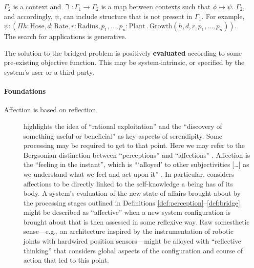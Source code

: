 $\Gamma_2$ is a context and $\beth : \Gamma_1 \rightarrow \Gamma_2$ is
a map between contexts such that $\phi \mapsto \psi$.  $\Gamma_2$, and
accordingly, $\psi$, can include structure that is not present in
$\Gamma_1$.  For example, $\psi : (\Pi h:\mathrm{Hose},
d:\mathrm{Rate}, r:\mathrm{Radius}, p_1,\ldots,p_n:\mathrm{Plant}
\mathbin{.}  \mathrm{Growth}(h,d,r,p_1,\ldots,p_n))$.  The search for
applications is generative.


\begin{defn}\label{def:result}
\hypertarget{def:result}{}The solution to the bridged problem is positively 
\textbf{evaluated} according to some pre-existing objective function.
This may be system-intrinsic, or specified by the system's user or a third party.
\end{defn}

\paragraph{\textbf{\upshape Foundations}}
                                         
\begin{description}                      
\item[Affection is based on reflection.]
\citet{campbell2005serendipity} highlights the idea of ``rational
exploitation'' and the ``discovery of something useful or
beneficial'' as key aspects of serendipity.
Some processing may be required
to get to that point. Here we may refer to the Bergsonian
distinction
between ``perceptions'' and ``affections''
\cite[p.~23]{deleuze1991bergsonism}.
Affection is the ``feeling in the instant'', which is {``}`alloyed'
to other subjectivities [\ldots] as we understand what we feel and
act upon it'' \cite[p.~141]{sutton2008deleuze}.
In particular,
\citet[p.~17]{bergson1991matter} considers affections to be directly
linked to the self-knowledge a being has of its body.  A system's
evaluation of the new state of affairs brought about by the processing
stages outlined in Definitions \ref{def:perception}--\ref{def:bridge}
might be described as ``affective''
when a new system configuration is brought about that is then assessed
in some reflexive way.  Raw somesthetic sense---e.g., an architecture inspired by
the instrumentation of robotic joints with hardwired position
sensors---might be alloyed with ``reflective thinking'' \cite{singh2005architecture}
that considers global aspects of the configuration and course of action
that led to this point.
\end{description}                        

